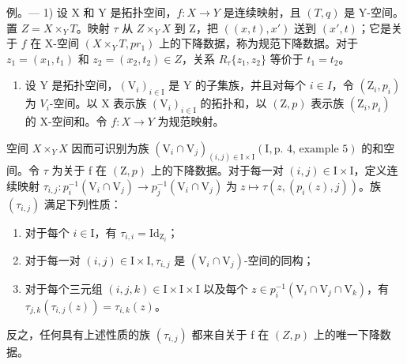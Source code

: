 例。--- 1) 设 X 和 Y 是拓扑空间，\(f\colon X \to Y\) 是连续映射，且 \((T,q)\) 是 Y-空间。置 \(Z = X \times_Y T\)。映射 \(\tau\) 从 \(Z \times_Y X\) 到 Z，把 \(((x,t),x')\) 送到 \((x',t)\)；它是关于 \(f\) 在 X-空间 \((X \times_Y T, pr_1)\) 上的下降数据，称为规范下降数据。对于 \(z_1 = (x_1, t_1)\) 和 \(z_2 = (x_2, t_2) \in Z\)，关系 \(R_{\tau}\{z_1, z_2\}\) 等价于 \(t_1 = t_2\)。

\begin{enumerate}
\def\labelenumi{\arabic{enumi})}
\setcounter{enumi}{1}
\tightlist
\item
  设 Y 是拓扑空间，\((\mathrm{V}_{i})_{i\in\mathrm{I}}\) 是 Y 的子集族，并且对每个 \(i\in I\)，令 \((\mathrm{Z}_{i},p_{i})\) 为 \(V_{i}\)-空间。以 X 表示族 \((\mathrm{V}_{i})_{i\in\mathrm{I}}\) 的拓扑和，以 \((\mathrm{Z},p)\) 表示族 \((\mathrm{Z}_{i},p_{i})\) 的 X-空间和。令 \(f:X\to Y\) 为规范映射。
\end{enumerate}

空间 \(X \times_{Y} X\) 因而可识别为族 \((\mathrm{V}_{i} \cap \mathrm{V}_{j})_{(i,j) \in \mathrm{I} \times \mathrm{I}}(\mathrm{I}, \text{p.~4, example 5})\) 的和空间。令 \(\tau\) 为关于 f 在 \((\mathrm{Z}, p)\) 上的下降数据。对于每一对 \((i, j) \in \mathrm{I} \times \mathrm{I}\)，定义连续映射 \(\tau_{i,j}\colon p_{i}^{-1}(\mathrm{V}_{i}\cap\mathrm{V}_{j})\to p_{j}^{-1}(\mathrm{V}_{i}\cap\mathrm{V}_{j})\;\text{为}\;z\mapsto\tau(z,(p_{i}(z),j))\)。族 \((\tau_{i,j})\) 满足下列性质：

\begin{enumerate}
\def\labelenumi{(\roman{enumi})}
\item
  对于每个 \(i \in \mathrm{I}\)，有 \(\tau_{i,i} = \mathrm{Id}_{\mathrm{Z}_i}\)；
\item
  对于每一对 \((i,j)\in \mathrm{I}\times \mathrm{I},\tau_{i,j}\) 是 \((\mathrm{V}_i\cap \mathrm{V}_j)\)-空间的同构；
\item
  对于每个三元组 \((i,j,k)\in\mathrm{I}\times \mathrm{I}\times \mathrm{I}\) 以及每个 \(z\in p_i^{-1} (\mathrm{V}_i\cap \mathrm{V}_j\cap \mathrm{V}_k)\)，有 \(\tau_{j,k}(\tau_{i,j}(z)) = \tau_{i,k}(z)\)。
\end{enumerate}

反之，任何具有上述性质的族 \((\tau_{i,j})\) 都来自关于 f 在 \((Z,p)\) 上的唯一下降数据。

